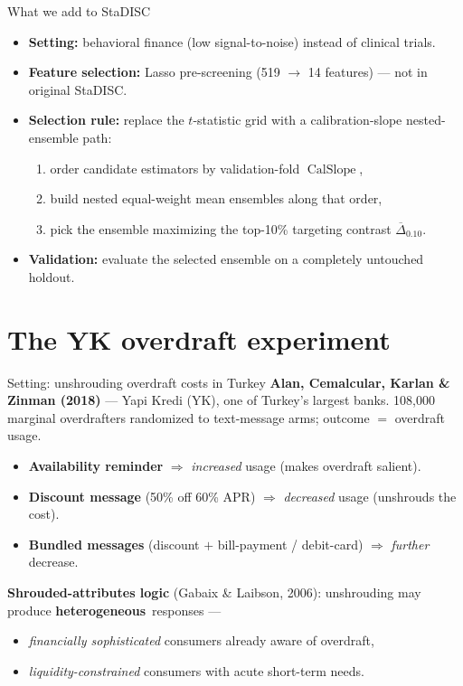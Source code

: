 \documentclass[aspectratio=169,11pt]{beamer}
\newcommand{\CalSlope}{\ensuremath{\operatorname{CalSlope}}}
\newcommand{\MeanDeltaTopTen}{\ensuremath{\overline{\Delta}_{0.10}}}
\newcommand{\het}{\textcolor{accent}{\textbf{heterogeneous}}}
\begin{document}
\begin{frame}{What we add to StaDISC}
\begin{itemize}
  \item \textbf{Setting:} behavioral finance (low signal-to-noise) instead of clinical trials.
  \item \textbf{Feature selection:} Lasso pre-screening (519 $\to$ 14 features) — not in original StaDISC.
  \item \textbf{Selection rule:} replace the $t$-statistic grid with a \alert{calibration-slope nested-ensemble path}:
    \begin{enumerate}
      \item order candidate estimators by validation-fold \CalSlope,
      \item build nested equal-weight mean ensembles along that order,
      \item pick the ensemble maximizing the top-10\% targeting contrast \MeanDeltaTopTen.
    \end{enumerate}
  \item \textbf{Validation:} evaluate the selected ensemble on a completely untouched holdout.
\end{itemize}
\end{frame}

\section{The YK overdraft experiment}

\begin{frame}{Setting: unshrouding overdraft costs in Turkey}
\textbf{Alan, Cemalcular, Karlan \& Zinman (2018)} — Yapi Kredi (YK), one of Turkey's largest banks. 108{,}000 marginal overdrafters randomized to text-message arms; outcome $=$ overdraft usage.

\vspace{0.2em}
\begin{itemize}
  \item \textbf{Availability reminder} $\Rightarrow$ \emph{increased} usage (makes overdraft salient).
  \item \textbf{Discount message} (50\% off 60\% APR) $\Rightarrow$ \emph{decreased} usage (unshrouds the cost).
  \item \textbf{Bundled messages} (discount $+$ bill-payment / debit-card) $\Rightarrow$ \emph{further} decrease.
\end{itemize}

\vspace{0.2em}
\textbf{Shrouded-attributes logic} (Gabaix \& Laibson, 2006): unshrouding may produce \het\ responses —
\begin{itemize}
  \item \emph{financially sophisticated} consumers already aware of overdraft,
  \item \emph{liquidity-constrained} consumers with acute short-term needs.
\end{itemize}
\end{frame}
\end{document}
